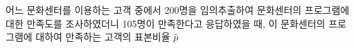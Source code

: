 어느 문화센터를 이용하는 고객 중에서 200명을 임의추출하여 문화센터의 프로그램에 대한 만족도를 조사하였더니 105명이 만족한다고 응답하였을 때, 이 문화센터의 프로그램에 대하여 만족하는 고객의 표본비율 $\hat{p}$
